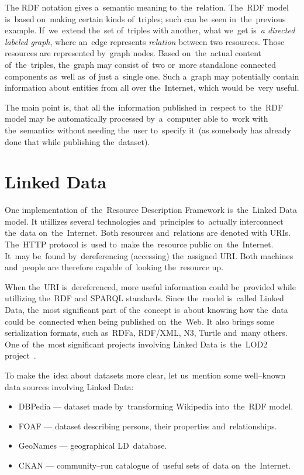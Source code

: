 The RDF notation gives a~semantic meaning to~the~relation. The~RDF model is~based on~making certain
kinds of~triples; such can be~seen in~the~previous example. If~we~extend the~set of~triples with another,
what we~get is~\emph{a directed labeled graph}, where an~edge represents \emph{relation} between two resources.
Those resources are represented by~graph nodes. Based on~the~actual content of~the~triples,
the~graph may consist of~two or~more standalone connected components as~well as~of
just a~single one. Such a~graph may potentially contain information about entities from all over
the~Internet, which would be~very useful.

The main point is, that all the~information published in~respect to~the~RDF model may be
automatically processed by~a~computer able to~work with the~semantics without
needing the~user to~specify it~(as somebody has already done that while publishing the~dataset).

\section{Linked Data}

One implementation of~the~Resource Description Framework is~the~Linked Data model.
It utillizes several technologies and~principles to~actually interconnect the~data on~the~Internet.
Both resources and~relations are denoted with URIs. The~HTTP protocol is~used to~make
the~resource public on~the~Internet. It~may be~found by~dereferencing (accessing) the~assigned
URI. Both machines and~people are therefore capable of~looking the~resource up.

When the~URI is~dereferenced, more useful information could be~provided while utillizing the~RDF
and SPARQL standards. Since the~model is~called Linked Data, the~most significant part
of the~concept is~about knowing how the~data could be~connected when being published on~the~Web.
It also brings some serialization formats, such as~RDFa, RDF/XML, N3, Turtle and~many others.
One of~the~most significant projects involving Linked Data is~the~LOD2 project~\cite{lod2}.

To make the~idea about datasets more clear, let us~mention some well--known data sources
involving Linked Data:

\begin{itemize}
\item DBPedia --- dataset made by~transforming Wikipedia into~the~RDF model.
\item FOAF --- dataset describing persons, their properties and~relationships.
\item GeoNames --- geographical LD~database.
\item CKAN --- community--run catalogue of~useful sets of~data on~the~Internet.
\end{itemize}

